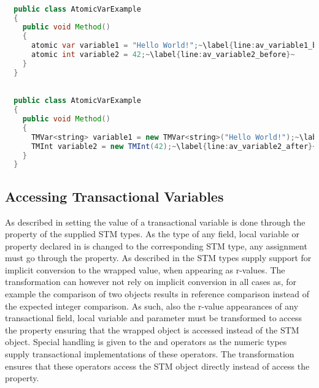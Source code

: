 \begin{lstlisting}[label=lst:before_atomic_variable,
  caption={\bscode{atomic} Local Variables Before Transformation},
  language=Java,  
  showspaces=false,
  showtabs=false,
  breaklines=true,
  showstringspaces=false,
  breakatwhitespace=true,
  escapechar=~,
  commentstyle=\color{greencomments},
  keywordstyle=\color{bluekeywords},
  stringstyle=\color{redstrings},
  morekeywords={atomic, retry, orelse, var, get, set}]  % Start your code-block

  public class AtomicVarExample
  {
    public void Method()
    {
      atomic var variable1 = "Hello World!";~\label{line:av_variable1_before}~
      atomic int variable2 = 42;~\label{line:av_variable2_before}~
    }
  }
\end{lstlisting}

\begin{lstlisting}[label=lst:after_atomic_variable,
  caption={\bscode{atomic} Local Variables After Transformation},
  language=Java,  
  showspaces=false,
  showtabs=false,
  breaklines=true,
  showstringspaces=false,
  breakatwhitespace=true,
  escapechar=~,
  commentstyle=\color{greencomments},
  keywordstyle=\color{bluekeywords},
  stringstyle=\color{redstrings},
  morekeywords={atomic, retry, orelse, var, get, set, string}]  % Start your code-block

  public class AtomicVarExample
  {
    public void Method()
    {
      TMVar<string> variable1 = new TMVar<string>("Hello World!");~\label{line:av_variable1_after}~
      TMInt variable2 = new TMInt(42);~\label{line:av_variable2_after}~
    }
  }
\end{lstlisting}

\subsection{Accessing Transactional Variables}
\label{subsec:roslyn_extension_accessing_variables}
As described in  setting the value of a transactional variable is done through the  property of the supplied \ac{STM} types. As the type of any field, local variable or property declared  in \stmnamesp is changed to the corresponding \ac{STM} type, any assignment must go through the  property. As described in  the \ac{STM} types supply support for implicit conversion to the wrapped value, when appearing as r-values. The transformation can however not rely on implicit conversion in all cases as, for example the comparison of two  objects results in reference comparison instead of the expected integer comparison. As such, also the r-value appearances of any transactional field, local variable and parameter must be transformed to access the  property ensuring that the wrapped object is accessed instead of the \ac{STM} object. Special handling is given to the \bscode{++} and \bscode{--} operators as the numeric  types supply transactional implementations of these operators. The transformation ensures that these operators access the \ac{STM} object directly instead of access the  property.

